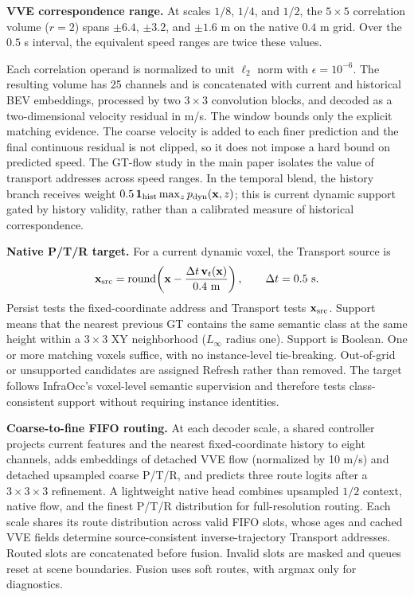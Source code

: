 \noindent\textbf{VVE correspondence range.}
At scales $1/8$, $1/4$, and $1/2$, the $5\times5$ correlation volume
($r=2$) spans $\pm6.4$, $\pm3.2$, and $\pm1.6$ m on the native $0.4$ m grid.
Over the $0.5$ s interval, the equivalent speed ranges are twice these values.

Each correlation operand is normalized to unit $\ell_2$ norm with
$\epsilon=10^{-6}$. The resulting volume has 25 channels and is concatenated
with current and historical BEV embeddings, processed by two $3\times3$
convolution blocks, and decoded as a two-dimensional velocity residual in m/s.
The window bounds only the
explicit matching evidence. The coarse velocity is
added to each finer prediction and the final continuous residual is not clipped,
so it does not impose a hard bound on predicted speed. The GT-flow study in the
main paper isolates the value of transport addresses across speed ranges. In
the temporal blend, the history branch receives weight
$0.5\,\mathbf 1_{\rm hist}\max_z p_{\rm dyn}(\mathbf x,z)$; this is current
dynamic support gated by history validity, rather than a calibrated measure of
historical correspondence.

\noindent\textbf{Native P/T/R target.}
For a current dynamic voxel, the Transport source is
\begin{equation}
 \mathbf x_{\rm src}=\operatorname{round}\!\left(
 \mathbf x-\frac{\Delta t\,\mathbf v_t(\mathbf x)}{0.4\ \mathrm m}\right),
 \qquad \Delta t=0.5\ \mathrm s.
\end{equation}
Persist tests the fixed-coordinate address and Transport tests $\mathbf x_{\rm src}$.
Support means that the nearest previous GT contains the same semantic class at
the same height within a $3\times3$ XY neighborhood ($L_\infty$ radius one).
Support is Boolean. One or more matching voxels suffice, with no instance-level
tie-breaking.
Out-of-grid or unsupported candidates are assigned Refresh rather than removed.
The target follows InfraOcc's voxel-level semantic supervision and therefore
tests class-consistent support without requiring instance identities.

\noindent\textbf{Coarse-to-fine FIFO routing.}
At each decoder scale, a shared controller projects current features and the
nearest fixed-coordinate history to eight channels, adds embeddings of detached VVE flow
(normalized by 10 m/s) and detached upsampled coarse P/T/R, and predicts three
route logits after a $3\times3\times3$ refinement. A lightweight native head
combines upsampled $1/2$ context, native flow, and the finest P/T/R distribution
for full-resolution routing. Each scale shares its route distribution across
valid FIFO slots, whose ages and cached VVE fields determine source-consistent
inverse-trajectory Transport addresses. Routed slots are concatenated before
fusion. Invalid slots are masked and queues reset at scene boundaries. Fusion
uses soft routes, with argmax only for diagnostics.


